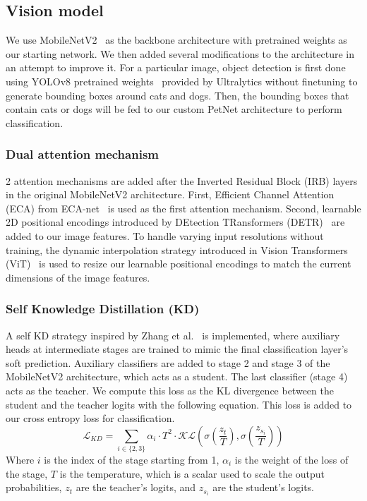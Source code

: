\documentclass[10pt,twocolumn,letterpaper]{article}
\begin{document}
\subsection{Vision model}
We use MobileNetV2~\cite{sandler2018mobilenetv2} as the backbone architecture with pretrained weights as our starting network. We then added several modifications to the architecture in an attempt to improve it. For a particular image, object detection is first done using YOLOv8 pretrained weights~\cite{10533619} provided by Ultralytics without finetuning to generate bounding boxes around cats and dogs. Then, the bounding boxes that contain cats or dogs will be fed to our custom PetNet architecture to perform classification.

\subsubsection{Dual attention mechanism}
2 attention mechanisms are added after the Inverted Residual Block (IRB) layers in the original MobileNetV2 architecture. First, Efficient Channel Attention (ECA) from ECA-net~\cite{Wang_2020_CVPR} is used as the first attention mechanism. Second, learnable 2D positional encodings introduced by DEtection TRansformers (DETR)~\cite{carion2020end} are added to our image features. To handle varying input resolutions without training, the dynamic interpolation strategy introduced in Vision Transformers (ViT)~\cite{dosovitskiy2020image} is used to resize our learnable positional encodings to match the current dimensions of the image features.

\subsubsection{Self Knowledge Distillation (KD)}
A self KD strategy inspired by Zhang et al.~\cite{zhang2019your} is implemented, where auxiliary heads at intermediate stages are trained to mimic the final classification layer's soft prediction. Auxiliary classifiers are added to stage 2 and stage 3 of the MobileNetV2 architecture, which acts as a student. The last classifier (stage 4) acts as the teacher. We compute this loss as the KL divergence between the student and the teacher logits with the following equation. This loss is added to our cross entropy loss for classification.
\begin{equation}
    \mathcal{L}_{KD} = \sum_{i \in \{2,3\}} \alpha_i \cdot T^2 \cdot \mathcal{KL} \left( \sigma \left( \frac{z_t}{T} \right), \sigma \left( \frac{z_{s_i}}{T} \right) \right)
\end{equation}
Where $i$ is the index of the stage starting from 1, $\alpha_i$ is the weight of the loss of the stage, $T$ is the temperature, which is a scalar used to scale the output probabilities, $z_t$ are the teacher's logits, and $z_{s_i}$ are the student's logits.
\end{document}
